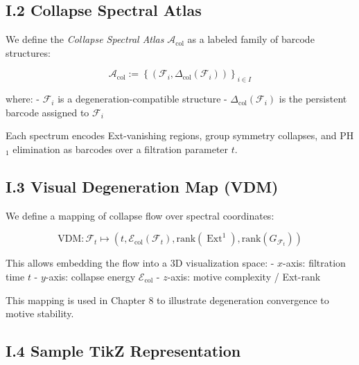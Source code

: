 \documentclass[11pt]{article}
\DeclareMathOperator{\Ext}{Ext}
\begin{document}
\subsection*{I.2 Collapse Spectral Atlas}

We define the \emph{Collapse Spectral Atlas} $\mathcal{A}_{\mathrm{col}}$ as a labeled family of barcode structures:

\[
\mathcal{A}_{\mathrm{col}} := \left\{ (\mathcal{F}_i, \Delta_{\mathrm{col}}(\mathcal{F}_i)) \right\}_{i \in I}
\]

where:
- $\mathcal{F}_i$ is a degeneration-compatible structure
- $\Delta_{\mathrm{col}}(\mathcal{F}_i)$ is the persistent barcode assigned to $\mathcal{F}_i$

Each spectrum encodes Ext-vanishing regions, group symmetry collapses, and PH$_1$ elimination as barcodes over a filtration parameter $t$.

\subsection*{I.3 Visual Degeneration Map (VDM)}

We define a mapping of collapse flow over spectral coordinates:

\[
\mathrm{VDM} : \mathcal{F}_t \mapsto \left( t, \mathcal{E}_{\mathrm{col}}(\mathcal{F}_t), \mathrm{rank}(\Ext^1), \mathrm{rank}(G_{\mathcal{F}_t}) \right)
\]

This allows embedding the flow into a 3D visualization space:
- $x$-axis: filtration time $t$
- $y$-axis: collapse energy $\mathcal{E}_{\mathrm{col}}$
- $z$-axis: motive complexity / Ext-rank

This mapping is used in Chapter 8 to illustrate degeneration convergence to motive stability.

\subsection*{I.4 Sample TikZ Representation}

\begin{center}
\end{center}
\end{document}
